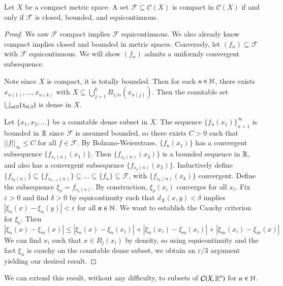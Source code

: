 \begin{theorem}
    Let $X$ be a compact metric space. A set $\mathcal{F} \subseteq \mathcal{C}(X)$ is compact in $\mathcal{C}(X)$ if and only if $\mathcal{F}$ is closed, bounded, and equicontinuous.
\end{theorem}
\begin{proof}
    We saw $\mathcal{F}$ compact implies $\mathcal{F}$ equicontinuous. We also already know compact implies closed and bounded in metric spaces. Conversely, let $(f_n) \subseteq \mathcal{F}$ with $\mathcal{F}$ equicontinuous. We will show $(f_n)$ admits a uniformly convergent subsequence.

    Note since $X$ is compact, it is totally bounded. Then for each $n \in \mathbb N$, there exists $x_{n(1)},...,x_{n(k)}$ with $X \subseteq \bigcup_{j=1}^kB_{1/n}(x_{n(j)})$. Then the countable set $\bigcup_{n\in\mathbb N}\{x_{n(j)}\}$ is dense in $X$.

    Let $\{x_1,x_2,...\}$ be a countable dense subset in $X$. The sequence $\{f_n(x_1)\}_{n=1}^{\infty}$ is bounded in $\mathbb R$ since $\mathcal{F}$ is assumed bounded, so there exists $C > 0$ such that $||f||_{\infty} \leq C$ for all $f \in \mathcal{F}$. By Bolzano-Weierstrass, $\{f_n(x_1)\}$ has a convergent subsequence $\{f_{s_1(n)}(x_1)\}$. Then $\{f_{s_2(n)}(x_2)\}$ is a bounded sequence in $\mathbb R$, and also has a convergent subsequence $\{f_{s_2(n)}(x_2)\}$. Inductively define $\{f_{s_k(n)}\}\subseteq \{f_{s_{k-1}(n)}\} \subseteq ... \subseteq \{f_n\}\subseteq \mathcal{F}$, with $\{f_{s_k(n)}(x_k)\}$ convergent. Define the subsequence $\xi_{\nu} = f_{s_{\nu}(\nu)}$. By construction, $\xi_{\nu}(x_i)$ converges for all $x_i$. Fix $\varepsilon > 0$ and find $\delta > 0$ by equicontinuity such that $d_X(x,y) < \delta$ implies $|\xi_n(x) - \xi_n(y)| < \varepsilon$ for all $n \in \mathbb N$. We want to establish the Cauchy criterion for $\xi_{\nu}$. Then $$|\xi_n(x) - \xi_m(x)| \leq |\xi_n(x) - \xi_n(x_i)| + |\xi_n(x_i) - \xi_m(x_i)| + |\xi_m(x_i) - \xi_m(x)|$$ We can find $x_i$ such that $x \in B_j(x_i)$ by density, so using equicontinuity and the fact $\xi_n$ is cauchy on the countable dense subset, we obtain an $\varepsilon/3$ argument yielding our desired result.
\end{proof}

We can extend this result, without any difficulty, to subsets of $\mathcal{C}(X,\mathbb R^n)$ for $n \in \mathbb N$.

